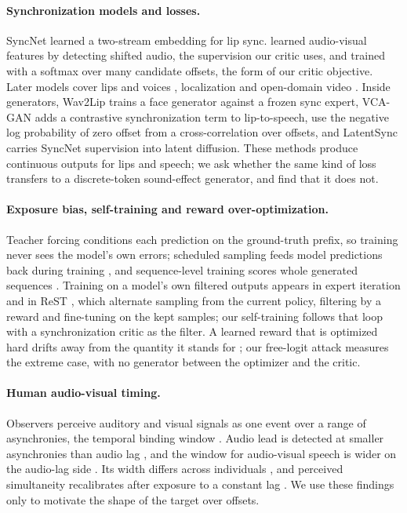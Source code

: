 \paragraph{Synchronization models and losses.}
SyncNet \citep{chung2016outoftime} learned a two-stream embedding for lip sync. \citet{owens2018audio} learned audio-visual features by detecting shifted audio, the supervision our critic uses, and \citet{chung2019perfect} trained with a softmax over many candidate offsets, the form of our critic objective. Later models cover lips and voices \citep{kadandale2022vocalist,chen2024mtdvocalist}, localization \citep{afouras2020self,arandjelovic2018objects} and open-domain video \citep{iashin2022sparse,iashin2024synchformer}. Inside generators, Wav2Lip \citep{prajwal2020wav2lip} trains a face generator against a frozen sync expert, VCA-GAN \citep{kim2021vcagan} adds a contrastive synchronization term to lip-to-speech, \citet{niu2023synchronization} use the negative log probability of zero offset from a cross-correlation over offsets, and LatentSync \citep{li2024latentsync} carries SyncNet supervision into latent diffusion. These methods produce continuous outputs for lips and speech; we ask whether the same kind of loss transfers to a discrete-token sound-effect generator, and find that it does not.

\paragraph{Exposure bias, self-training and reward over-optimization.}
Teacher forcing conditions each prediction on the ground-truth prefix, so training never sees the model's own errors; scheduled sampling feeds model predictions back during training \citep{bengio2015scheduled}, and sequence-level training scores whole generated sequences \citep{ranzato2016sequence}. Training on a model's own filtered outputs appears in expert iteration \citep{anthony2017thinking} and in ReST \citep{gulcehre2023rest}, which alternate sampling from the current policy, filtering by a reward and fine-tuning on the kept samples; our self-training follows that loop with a synchronization critic as the filter. A learned reward that is optimized hard drifts away from the quantity it stands for \citep{gao2023scaling}; our free-logit attack measures the extreme case, with no generator between the optimizer and the critic.

\paragraph{Human audio-visual timing.}
Observers perceive auditory and visual signals as one event over a range of asynchronies, the temporal binding window \citep{wallace2014construct}. Audio lead is detected at smaller asynchronies than audio lag \citep{dixon1980detection}, and the window for audio-visual speech is wider on the audio-lag side \citep{vanwassenhove2007temporal,vroomen2010perception}. Its width differs across individuals \citep{stevenson2012individual}, and perceived simultaneity recalibrates after exposure to a constant lag \citep{fujisaki2004recalibration,takeshima2021visual}. We use these findings only to motivate the shape of the target over offsets.
